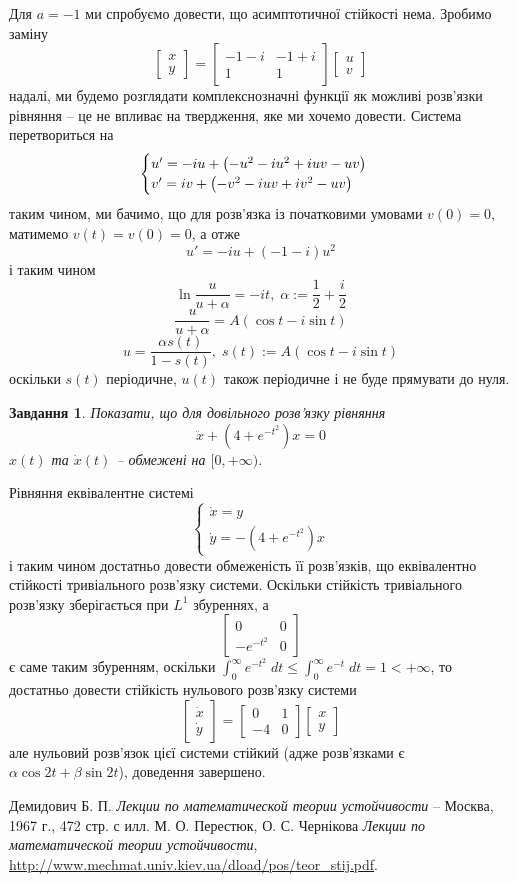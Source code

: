 \documentclass[12pt]{article} %
\newtheorem{prob}{Завдання}
\begin{document}
	Для $a=-1$ ми спробуємо довести, що асимптотичної стійкості нема. Зробимо заміну
	\[\begin{bmatrix}x\\y\end{bmatrix}=\begin{bmatrix}-1-i&-1+i\\1&1\end{bmatrix}\begin{bmatrix}u\\v\end{bmatrix}\]
	надалі, ми будемо розглядати комплекснозначні функції як можливі розв’язки рівняння -- це не впливає на твердження, яке ми хочемо довести.
	Система перетвориться на
	\[\begin{cases}u'=-iu+
		\left(-u^2-iu^2+iuv-uv\right)
		\\v'=iv+
		\left(-v^2-iuv+iv^2-uv\right)
	\end{cases}\]
	таким чином, ми бачимо, що для розв’язка із початковими умовами $v(0)=0$, матимемо $v(t)=v(0)=0$, а отже
	\[u'=-iu+(-1-i)u^2\]
	і таким чином
	\[\ln\frac{u}{u+\alpha}=-it,\;\alpha:=\frac{1}{2}+\frac{i}{2}\]
	\[\frac{u}{u+\alpha}=A(\cos t-i\sin t)\]
	\[u=\frac{\alpha s(t)}{1-s(t)},\;s(t):=A(\cos t-i\sin t)\]
	оскільки $s(t)$ періодичне, $u(t)$ також періодичне і не буде прямувати до нуля.
\begin{prob}Показати, що для довільного розв’язку рівняння
	\[\ddot{x}+(4+e^{-t^2})x=0\]
	$x(t)$ та $\dot{x}(t)$ -- обмежені на $[0,+\infty)$.\end{prob}
	Рівняння еквівалентне системі
	\[\begin{cases}\dot{x}=y\\\dot{y}=-(4+e^{-t^2})x\end{cases}\]
	і таким чином достатньо довести обмеженість її розв’язків, що еквівалентно стійкості тривіального розв’язку системи. Оскільки стійкість
	тривіального розв’язку зберігається при $L^1$ збуреннях, а \[\begin{bmatrix}0&0\\-e^{-t^2}&0\end{bmatrix}\]
	є саме таким збуренням, оскільки $\int_0^\infty e^{-t^2}\;dt\leq\int_0^\infty e^{-t}\;dt=1<+\infty$, то достатньо довести стійкість 
	нульового розв’язку системи
	\[\begin{bmatrix}\dot{x}\\\dot{y}\end{bmatrix}=\begin{bmatrix}0&1\\-4&0\end{bmatrix}\begin{bmatrix}x\\y\end{bmatrix}\]
	але нульовий розв’язок цієї системи стійкий (адже розв’язками є $\alpha\cos 2t+\beta\sin 2t$), доведення завершено.
\begin{thebibliography}{9}
Демидович Б. П. \emph{Лекции по математической теории устойчивости} --
Москва, 1967 г., 472 стр. с илл.
М. О. Перестюк, О. С. Чернікова \emph{Лекции по математической теории устойчивости}, \url{
http://www.mechmat.univ.kiev.ua/dload/pos/teor_stij.pdf}.
\end{thebibliography}
\end{document}
